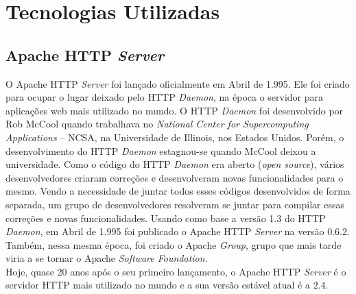 \chapter{Tecnologias Utilizadas}\label{cap:tecnologias_utilizadas}
\section{Apache HTTP \textit{Server}}
O Apache HTTP \textit{Server} foi lançado oficialmente em Abril de 1.995. Ele 
foi criado para ocupar o lugar deixado pelo HTTP \textit{Daemon}, na época o 
servidor para aplicações web mais utilizado no mundo. O HTTP \textit{Daemon} 
foi desenvolvido por Rob McCool quando trabalhava no \textit{National Center 
for Supercomputing Applications} – NCSA, na Universidade de Illinois, nos 
Estados Unidos. Porém, o desenvolvimento do HTTP \textit{Daemon} estagnou-se 
quando McCool deixou a universidade. Como o código do HTTP \textit{Daemon} era 
aberto (\textit{open source}), vários desenvolvedores criaram correções e 
desenvolveram novas funcionalidades para o mesmo. Vendo a necessidade de juntar 
todos esses códigos desenvolvidos de forma separada, um grupo de 
desenvolvedores resolveram se juntar para compilar essas correções e novas 
funcionalidades. Usando como base a versão 1.3 do HTTP \textit{Daemon}, em 
Abril de 1.995 foi publicado o Apache HTTP \textit{Server} na versão 0.6.2. 
Também, nessa mesma época, foi criado o Apache \textit{Group}, grupo que mais 
tarde viria a se tornar o Apache \textit{Software Foundation}.\\
Hoje, quase 20 anos após o seu primeiro lançamento, o Apache HTTP \textit{Server} é o servidor HTTP mais utilizado no mundo e a sua versão estável atual é a 2.4.\\
